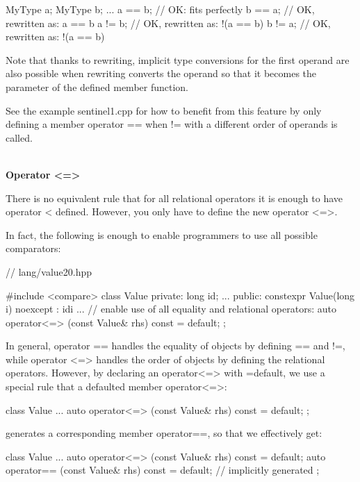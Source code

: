 \begin{cpp}
MyType a;
MyType b;
...
a == b; // OK: fits perfectly
b == a; // OK, rewritten as: a == b
a != b; // OK, rewritten as: !(a == b)
b != a; // OK, rewritten as: !(a == b)
\end{cpp}

Note that thanks to rewriting, implicit type conversions for the first operand are also possible when rewriting converts the operand so that it becomes the parameter of the defined member function.

See the example sentinel1.cpp for how to benefit from this feature by only defining a member operator == when != with a different order of operands is called.

\noindent
\hspace*{\fill} \\ %
\textbf{Operator <=>}

There is no equivalent rule that for all relational operators it is enough to have operator < defined. However, you only have to define the new operator <=>.

In fact, the following is enough to enable programmers to use all possible comparators:

\begin{cpp}
// lang/value20.hpp

#include <compare>
class Value {
private:
	long id;
	...
public:
	constexpr Value(long i) noexcept
	: id{i} {
	}
	...
	// enable use of all equality and relational operators:
	auto operator<=> (const Value& rhs) const = default;
};
\end{cpp}

In general, operator == handles the equality of objects by defining == and !=, while operator <=> handles the order of objects by defining the relational operators. However, by declaring an operator<=> with =default, we use a special rule that a defaulted member operator<=>:

\begin{cpp}
class Value {
	...
	auto operator<=> (const Value& rhs) const = default;
};
\end{cpp}

generates a corresponding member operator==, so that we effectively get:

\begin{cpp}
class Value {
	...
	auto operator<=> (const Value& rhs) const = default;
	auto operator== (const Value& rhs) const = default; // implicitly generated
};
\end{cpp}

